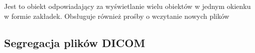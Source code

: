 \label{sec:sokar-dicomtabs}

\par
Jest to obiekt odpowiadający za wyświetlanie wielu obiektów  w jednym okienku w formie zakładek.
Obsługuje również prośby o wczytanie nowych plików

\subsection{Segregacja plików DICOM}